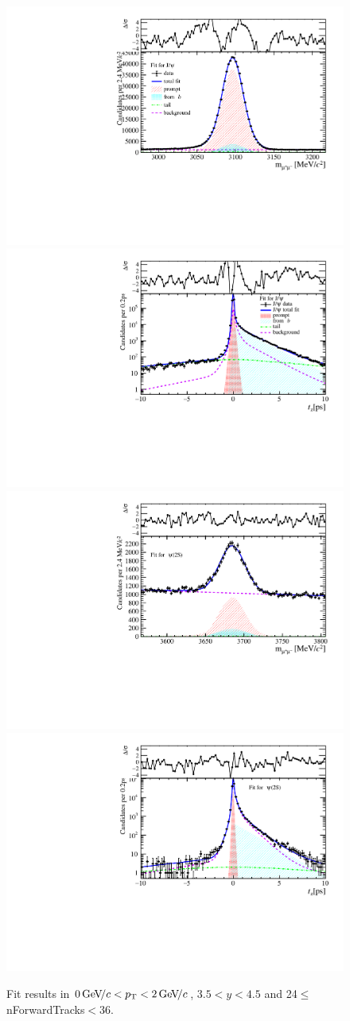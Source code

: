 \begin{figure}[H]
\begin{center}
\includegraphics[width=0.47\linewidth]{pdf/Jpsi/drawmassF/n3y3pt1.pdf}
\includegraphics[width=0.47\linewidth]{pdf/Jpsi/2DFitF/n3y3pt1.pdf}
\vspace*{-0.5cm}
\includegraphics[width=0.47\linewidth]{pdf/Psi2S/drawmassF/n3y3pt1.pdf}
\includegraphics[width=0.47\linewidth]{pdf/Psi2S/2DFitF/n3y3pt1.pdf}
\vspace*{-0.5cm}
\end{center}
\caption{Fit results in $0\text{\,Ge\kern -0.1em V\!/}c<p_{\mathrm{T}}<2\text{\,Ge\kern -0.1em V\!/}c$, $3.5<y<4.5$ and 24$\leq$nForwardTracks$<$36.}
\label{Fitn3y3pt1}
\end{figure}
